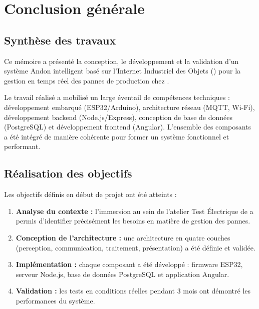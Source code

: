 \chapter{Conclusion g\'en\'erale}

\section{Synth\`ese des travaux}

Ce m\'emoire a pr\'esent\'e la conception, le d\'eveloppement et la validation d'un syst\`eme Andon intelligent bas\'e sur l'Internet Industriel des Objets (\iiot) pour la gestion en temps r\'eel des pannes de production chez \sews.

Le travail r\'ealis\'e a mobilis\'e un large \'eventail de comp\'etences techniques : d\'eveloppement embarqu\'e (ESP32/Arduino), architecture r\'eseau (MQTT, Wi-Fi), d\'eveloppement backend (Node.js/Express), conception de base de donn\'ees (PostgreSQL) et d\'eveloppement frontend (Angular). L'ensemble des composants a \'et\'e int\'egr\'e de mani\`ere coh\'erente pour former un syst\`eme fonctionnel et performant.

\section{R\'ealisation des objectifs}

Les objectifs d\'efinis en d\'ebut de projet ont \'et\'e atteints :

\begin{enumerate}
    \item \textbf{Analyse du contexte :} l'immersion au sein de l'atelier Test \'Electrique de \sews a permis d'identifier pr\'ecis\'ement les besoins en mati\`ere de gestion des pannes.
    
    \item \textbf{Conception de l'architecture :} une architecture en quatre couches (perception, communication, traitement, pr\'esentation) a \'et\'e d\'efinie et valid\'ee.
    
    \item \textbf{Impl\'ementation :} chaque composant a \'et\'e d\'evelopp\'e : firmware ESP32, serveur Node.js, base de donn\'ees PostgreSQL et application Angular.
    
    \item \textbf{Validation :} les tests en conditions r\'eelles pendant 3 mois ont d\'emontr\'e les performances du syst\`eme.
\end{enumerate}

